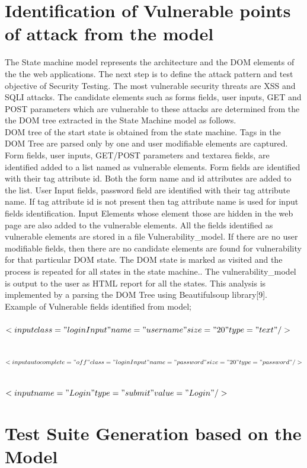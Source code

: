 \section{Identification of Vulnerable points of attack from the model}
The State machine model represents the architecture and the DOM elements of the the web applications. The next step is to define the attack pattern and test objective of Security Testing. The most vulnerable security threats are XSS and SQLI attacks. The candidate elements such as forms fields, user inputs, GET and POST parameters which are vulnerable to these attacks are determined from the the DOM tree extracted in the State Machine model as follows. 
\\
DOM tree of the start state is obtained from the state machine. Tags in the DOM Tree are parsed only by one and user modifiable elements are captured.
Form fields, user inputs, GET/POST parameters and textarea fields, are identified added to a list named as vulnerable elements. Form fields are identified with their tag attribute id. Both the form name and id attributes are added to the list. User Input fields, password field are identified with their tag attribute name. If tag attribute id is not present then tag attribute name is used for input fields identification. Input Elements whose element those are hidden in the web page are also added to the vulnerable elements. All the fields identified as vulnerable elements are stored in a file Vulnerability\_model.
If there are no user modifiable fields, then there are no candidate elements are found for vulnerability for that particular DOM state. The DOM state is marked as visited and the process is repeated for all states in the state machine.. The vulnerability\_model is output to the user as HTML report for all the states.
This analysis is implemented by a parsing the DOM Tree using Beautifulsoup library[9]. \\

Example of Vulnerable fields identified from model;\\

 \\$<input class="loginInput" name="username" size="20" type="text"/>$

 \\$<input autocomplete="off" class="loginInput" name="password" size="20" type="password"/>$

 \\$<input name="Login" type="submit" value="Login"/>$

\section{Test Suite Generation based on the Model}

